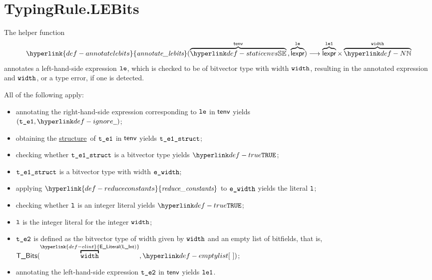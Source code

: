 \documentclass{book}
\newcommand\ProseOrTypeError[0]{\ProseTerminateAs{\TypeErrorConfig}}
\newcommand\annotatelebits[0]{\hyperlink{def-annotatelebits}{\textfunc{annotate\_lebits}}}
\newcommand\ELInt[1]{\overbracket{#1}^{\hyperlink{def-elint}{\ELiteral(\lint)}}}
\newcommand\structure[0]{\hyperlink{def-structure}{structure}}
\newcommand\reduceconstants[0]{\hyperlink{def-reduceconstants}{\textfunc{reduce\_constants}}}
\begin{document}

\section{TypingRule.LEBits \label{sec:TypingRule.LEBits}}
\hypertarget{def-annotatelebits}{}
The helper function
\[
  \annotatelebits(\overname{\staticenvs}{\tenv} \aslsep \overname{\lexpr}{\vle})
  \aslto \overname{\lexpr}{\vleone} \times \overname{\N}{\width}
\]
annotates a left-hand-side expression $\texttt{le}$, which is checked to be of bitvector type
with width $\texttt{width}$,
resulting in the annotated expression and $\texttt{width}$, or a type error, if one is detected.

All of the following apply:
\begin{itemize}
  \item annotating the right-hand-side expression corresponding to $\texttt{le}$ in $\textsf{tenv}$ yields \\ $(\vteone, \Ignore)$\ProseOrTypeError;
  \item obtaining the \structure\ of $\texttt{t\_e1}$ in $\textsf{tenv}$ yields $\texttt{t\_e1\_struct}$\ProseOrTypeError;
  \item checking whether $\texttt{t\_e1\_struct}$ is a bitvector type yields $\True$\ProseOrTypeError;
  \item $\texttt{t\_e1\_struct}$ is a bitvector type with width $\texttt{e\_width}$;
  \item applying $\reduceconstants$ to $\texttt{e\_width}$ yields the literal $\texttt{l}$\ProseOrTypeError;
  \item checking whether $\texttt{l}$ is an integer literal yields $\True$\ProseOrTypeError;
  \item $\texttt{l}$ is the integer literal for the integer $\texttt{width}$;
  \item $\texttt{t\_e2}$ is defined as the bitvector type of width given by $\texttt{width}$ and an empty list of bitfields, that is,
        $\TBits(\ELInt{\width}, \emptylist)$;
  \item annotating the left-hand-side expression $\texttt{t\_e2}$ in $\textsf{tenv}$ yields $\texttt{le1}$\ProseOrTypeError.
\end{itemize}
\end{document}
